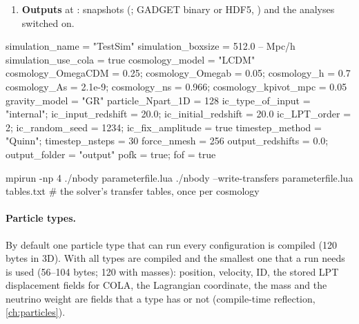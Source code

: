 \begin{enumerate}
      ; uniform in $a^p$ with  for the  spacing,
      \cref{sec:nbody-timestepping}; kick--drift--kick, , the only ordering implemented); in each
      step the density (and its $P(k)$, almost free since it is already in Fourier
      space), the force of the gravity model, the kick and the drift, with COLA if enabled (with
       the PM force is skipped and the particles follow their LPT trajectories,
      a check of the COLA frame); particle migration between slabs; the lightcone.
\item \textbf{Outputs} at : snapshots (; GADGET binary or HDF5,
      ) and the analyses switched on.
\end{enumerate}

\begin{paramfile}
simulation_name      = "TestSim"
simulation_boxsize   = 512.0           -- Mpc/h
simulation_use_cola  = true
cosmology_model      = "LCDM"
cosmology_OmegaCDM   = 0.25;  cosmology_Omegab = 0.05;  cosmology_h = 0.7
cosmology_As = 2.1e-9;  cosmology_ns = 0.966;  cosmology_kpivot_mpc = 0.05
gravity_model        = "GR"
particle_Npart_1D    = 128
ic_type_of_input     = "internal";  ic_input_redshift = 20.0;  ic_initial_redshift = 20.0
ic_LPT_order         = 2;  ic_random_seed = 1234;  ic_fix_amplitude = true
timestep_method      = "Quinn";  timestep_nsteps = {30}
force_nmesh          = 256
output_redshifts     = {0.0};  output_folder = "output"
pofk = true;  fof = true
\end{paramfile}
\begin{paramfile}[Running]
mpirun -np 4 ./nbody parameterfile.lua
./nbody --write-transfers parameterfile.lua tables.txt   # the solver's transfer tables, once per cosmology
\end{paramfile}

\paragraph*{Particle types.} By default one particle type that can run every configuration is compiled (120 bytes
in 3D). With  all types are compiled and the smallest one that a run needs is used
(56--104 bytes; 120 with masses): position, velocity, ID, the stored LPT displacement fields for COLA, the Lagrangian
coordinate, the mass and the neutrino weight are fields that a type has or not (compile-time reflection,
\cref{ch:particles}).


